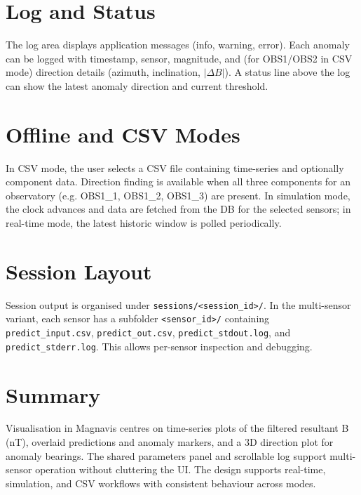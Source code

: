 \section{Log and Status}
The log area displays application messages (info, warning, error). Each anomaly can be logged with timestamp, sensor, magnitude, and (for OBS1/OBS2 in CSV mode) direction details (azimuth, inclination, $|\Delta B|$). A status line above the log can show the latest anomaly direction and current threshold.

\section{Offline and CSV Modes}
In CSV mode, the user selects a CSV file containing time-series and optionally component data. Direction finding is available when all three components for an observatory (e.g. OBS1\_1, OBS1\_2, OBS1\_3) are present. In simulation mode, the clock advances and data are fetched from the DB for the selected sensors; in real-time mode, the latest historic window is polled periodically.

\section{Session Layout}
Session output is organised under \texttt{sessions/<session\_id>/}. In the multi-sensor variant, each sensor has a subfolder \texttt{<sensor\_id>/} containing \texttt{predict\_input.csv}, \texttt{predict\_out.csv}, \texttt{predict\_stdout.log}, and \texttt{predict\_stderr.log}. This allows per-sensor inspection and debugging.

\section*{Summary}
Visualisation in Magnavis centres on time-series plots of the filtered resultant B (nT), overlaid predictions and anomaly markers, and a 3D direction plot for anomaly bearings. The shared parameters panel and scrollable log support multi-sensor operation without cluttering the UI. The design supports real-time, simulation, and CSV workflows with consistent behaviour across modes.

